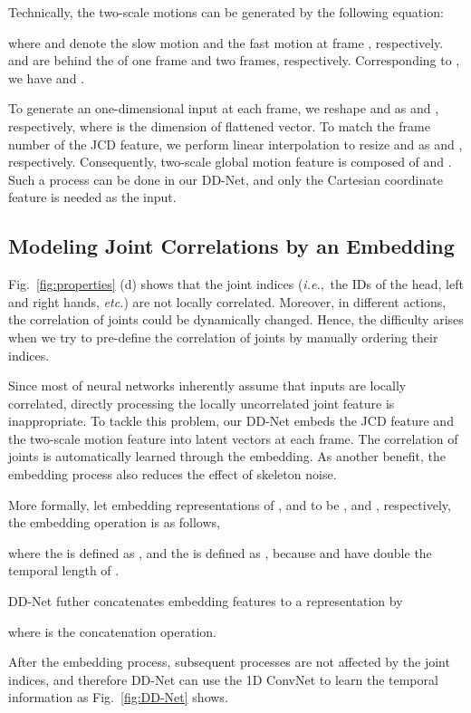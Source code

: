 \documentclass[journal]{IEEEtran}
\newcommand{\ie}{{\it i.e.}}
\newcommand{\etc}{{\it etc.}}
\begin{document}
Technically, the two-scale motions can be generated by the following equation:

where  and  denote the slow motion and the fast motion at frame , respectively.  and  are behind the  of one frame and two frames, respectively. Corresponding to , we have  and .

To generate an one-dimensional input at each frame, we reshape  and  as  and , respectively, where  is the dimension of flattened vector. To match the frame number of the JCD feature, we perform linear interpolation to resize  and  as  and , respectively. Consequently, two-scale global motion feature is composed of  and . Such a process can be done in our DD-Net, and only the Cartesian coordinate feature is needed as the input.



\subsection{Modeling Joint Correlations by an Embedding}

Fig.~\textcolor{red}{\ref{fig:properties}} (d) shows that the joint indices (\ie,~the IDs of the head, left and right hands, \etc) are not locally correlated. Moreover, in different actions, the correlation of joints could be dynamically changed. Hence, the difficulty arises when we try to pre-define the correlation of joints by manually ordering their indices.  

Since most of neural networks inherently assume that inputs are locally correlated, directly processing the locally uncorrelated joint feature is inappropriate. To tackle this problem, our DD-Net embeds the JCD feature and the two-scale motion feature into latent vectors at each frame. The correlation of joints is automatically learned through the embedding. As another benefit, the embedding process also reduces the effect of skeleton noise. 

More formally, let embedding representations of ,  and  to be  ,  and , respectively, the embedding operation is as follows,

where the  is defined as , and the  is defined as , because  and  have double the temporal length of .

DD-Net futher concatenates embedding features to a representation  by

where  is the concatenation operation.


After the embedding process, subsequent processes are not affected by the joint indices, and therefore DD-Net can use the 1D ConvNet to learn the temporal information as Fig.~\textcolor{red}{\ref{fig:DD-Net}} shows.
\end{document}
